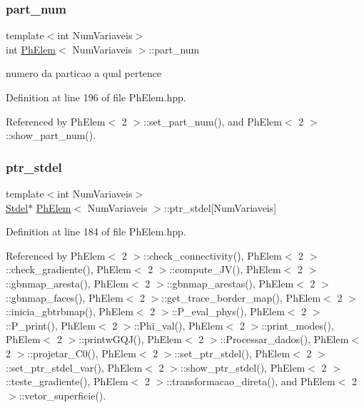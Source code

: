 \subsubsection{\texorpdfstring{part\+\_\+num}{part\_num}}
{\footnotesize\ttfamily template$<$int Num\+Variaveis$>$ \\
int \hyperlink{classPhElem}{Ph\+Elem}$<$ Num\+Variaveis $>$\+::part\+\_\+num\hspace{0.3cm}{\ttfamily [protected]}}



numero da particao a qual pertence 



Definition at line 196 of file Ph\+Elem.\+hpp.



Referenced by Ph\+Elem$<$ 2 $>$\+::set\+\_\+part\+\_\+num(), and Ph\+Elem$<$ 2 $>$\+::show\+\_\+part\+\_\+num().

\mbox{\label{classPhElem_a7b4509b90bcf92be76cd8fdb76d7385b}} 
\subsubsection{\texorpdfstring{ptr\+\_\+stdel}{ptr\_stdel}}
{\footnotesize\ttfamily template$<$int Num\+Variaveis$>$ \\
\hyperlink{classStdel}{Stdel}$\ast$ \hyperlink{classPhElem}{Ph\+Elem}$<$ Num\+Variaveis $>$\+::ptr\+\_\+stdel\mbox{[}Num\+Variaveis\mbox{]}\hspace{0.3cm}{\ttfamily [protected]}}



Definition at line 184 of file Ph\+Elem.\+hpp.



Referenced by Ph\+Elem$<$ 2 $>$\+::check\+\_\+connectivity(), Ph\+Elem$<$ 2 $>$\+::check\+\_\+gradiente(), Ph\+Elem$<$ 2 $>$\+::compute\+\_\+\+J\+V(), Ph\+Elem$<$ 2 $>$\+::gbnmap\+\_\+aresta(), Ph\+Elem$<$ 2 $>$\+::gbnmap\+\_\+arestas(), Ph\+Elem$<$ 2 $>$\+::gbnmap\+\_\+faces(), Ph\+Elem$<$ 2 $>$\+::get\+\_\+trace\+\_\+border\+\_\+map(), Ph\+Elem$<$ 2 $>$\+::inicia\+\_\+gbtrbmap(), Ph\+Elem$<$ 2 $>$\+::\+P\+\_\+eval\+\_\+phys(), Ph\+Elem$<$ 2 $>$\+::\+P\+\_\+print(), Ph\+Elem$<$ 2 $>$\+::\+Phi\+\_\+val(), Ph\+Elem$<$ 2 $>$\+::print\+\_\+modes(), Ph\+Elem$<$ 2 $>$\+::printw\+G\+Q\+J(), Ph\+Elem$<$ 2 $>$\+::\+Processar\+\_\+dados(), Ph\+Elem$<$ 2 $>$\+::projetar\+\_\+\+C0(), Ph\+Elem$<$ 2 $>$\+::set\+\_\+ptr\+\_\+stdel(), Ph\+Elem$<$ 2 $>$\+::set\+\_\+ptr\+\_\+stdel\+\_\+var(), Ph\+Elem$<$ 2 $>$\+::show\+\_\+ptr\+\_\+stdel(), Ph\+Elem$<$ 2 $>$\+::teste\+\_\+gradiente(), Ph\+Elem$<$ 2 $>$\+::transformacao\+\_\+direta(), and Ph\+Elem$<$ 2 $>$\+::vetor\+\_\+superficie().

